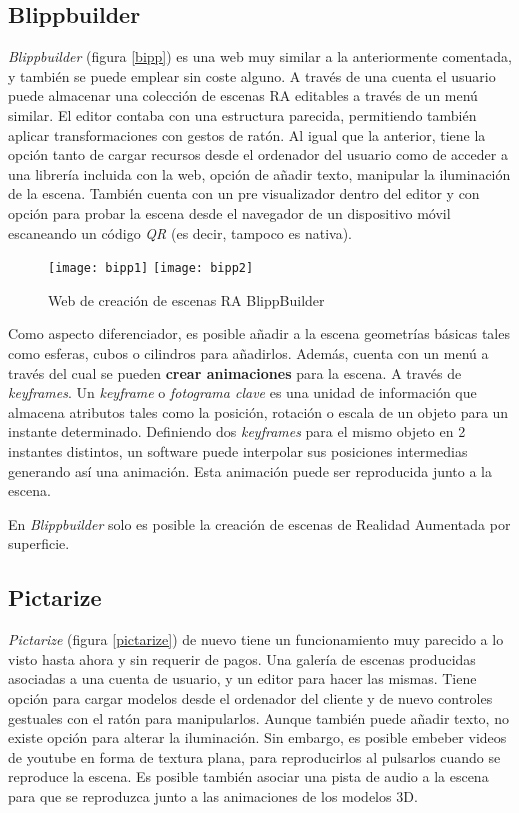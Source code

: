 \subsection{Blippbuilder}

\textit{Blippbuilder}\cite{blippbuilder} (figura \ref{bipp}) es una web muy similar a la anteriormente comentada, y también se puede emplear sin coste alguno. A través de una cuenta el usuario puede almacenar una colección de escenas RA editables a través de un menú similar. El editor contaba con una estructura parecida, permitiendo también aplicar transformaciones con gestos de ratón. Al igual que la anterior, tiene la opción tanto de cargar recursos desde el ordenador del usuario como de acceder a una librería incluida con la web, opción de añadir texto, manipular la iluminación de la escena. También cuenta con un pre visualizador dentro del editor y con opción para probar la escena desde el navegador de un dispositivo móvil escaneando un código \textit{QR} (es decir, tampoco es nativa).

\begin{figure}[h]
    \centering
    \texttt{[image: bipp1]}
    \texttt{[image: bipp2]}
    \caption[Aplicación BlippBuilder]{Web de creación de escenas RA BlippBuilder}
    \label{fig:bipp}
\end{figure}

Como aspecto diferenciador, es posible añadir a la escena geometrías básicas tales como esferas, cubos o cilindros para añadirlos. Además, cuenta con un menú a través del cual se pueden \textbf{crear animaciones} para la escena. A través de \textit{keyframes}. Un \textit{keyframe} o \textit{fotograma clave} es una unidad de información que almacena atributos tales como la posición, rotación o escala de un objeto para un instante determinado. Definiendo dos \textit{keyframes} para el mismo objeto en 2 instantes distintos, un software puede interpolar sus posiciones intermedias generando así una animación. Esta animación puede ser reproducida junto a la escena.

En \textit{Blippbuilder} solo es posible la creación de escenas de Realidad Aumentada por superficie.

\subsection{Pictarize}
\textit{Pictarize}\cite{pictarize} (figura \ref{pictarize}) de nuevo tiene un funcionamiento muy parecido a lo visto hasta ahora y sin requerir de pagos. Una galería de escenas producidas asociadas a una cuenta de usuario, y un editor para hacer las mismas. Tiene opción para cargar modelos desde el ordenador del cliente y de nuevo controles gestuales con el ratón para manipularlos. Aunque también puede añadir texto, no existe opción para alterar la iluminación. Sin embargo, es posible embeber videos de youtube en forma de textura plana, para reproducirlos al pulsarlos cuando se reproduce la escena. Es posible también asociar una pista de audio a la escena para que se reproduzca junto a las animaciones de los modelos 3D.

